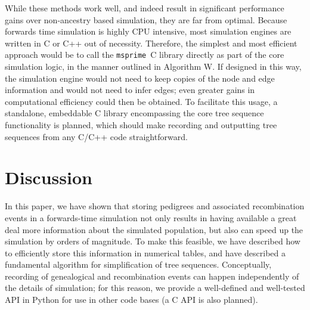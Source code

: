 \documentclass{article}
\newcommand{\fwdpp}{\texttt{fwdpp}}
\newcommand{\cpp}{\texttt{C++}}
\newcommand{\msprime}{\texttt{msprime}}
\begin{document}
While these methods work well, and indeed result in significant performance
gains over non-ancestry based simulation, they are far from optimal. Because
forwards time simulation is highly CPU intensive, most simulation engines
are written in C or C++ out of necessity. Therefore, the simplest and most
efficient approach would be to call the \msprime\ C library directly as part of
the core simulation logic, in the manner outlined in Algorithm W. If designed
in this way, the simulation engine would not need to keep copies of the node
and edge information and would not need to infer edges;
even greater gains in computational efficiency could then be obtained. To
facilitate this usage, a standalone, embeddable C library encompassing the core
tree sequence functionality is planned, which should make recording and
outputting tree sequences from any C/C++ code straightforward.





\section*{Discussion}

In this paper, we have shown that storing pedigrees
and associated recombination events
in a forwards-time simulation
not only results in having available a great deal more information about the simulated population,
but also can speed up the simulation by orders of magnitude.
To make this feasible,
we have described how to efficiently store this information in numerical tables,
and have described a fundamental algorithm for simplification of tree sequences.
Conceptually, recording of genealogical and recombination events
can happen independently of the details of simulation;
for this reason, we provide a well-defined and well-tested API in Python
for use in other code bases (a C API is also planned).
\end{document}
